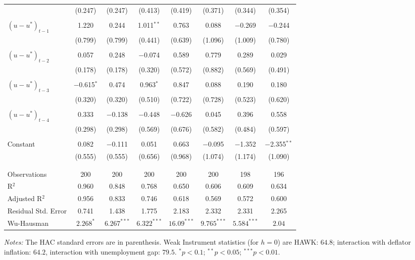 \documentclass[11pt]{article}
\begin{document}
\begin{table}[!htbp]
\begin{threeparttable}
\begin{tabular}{@{\extracolsep{5pt}}lccccccc}
    & (0.247) & (0.247) & (0.413) & (0.419) & (0.371) & (0.344) & (0.354) \\ 
    & & & & & & & \\ 
   $\left(u-u^*\right)_{t-1}$ & 1.220 & 0.244 & 1.011$^{**}$ & 0.763 & 0.088 & $-$0.269 & $-$0.244 \\ 
    & (0.799) & (0.799) & (0.441) & (0.639) & (1.096) & (1.009) & (0.780) \\ 
    & & & & & & & \\ 
    $\left(u-u^*\right)_{t-2}$ & 0.057 & 0.248 & $-$0.074 & 0.589 & 0.779 & 0.289 & 0.029 \\ 
    & (0.178) & (0.178) & (0.320) & (0.572) & (0.882) & (0.569) & (0.491) \\ 
    & & & & & & & \\ 
    $\left(u-u^*\right)_{t-3}$ & $-$0.615$^{*}$ & 0.474 & 0.963$^{*}$ & 0.847 & 0.088 & 0.190 & 0.180 \\ 
    & (0.320) & (0.320) & (0.510) & (0.722) & (0.728) & (0.523) & (0.620) \\ 
    & & & & & & & \\ 
    $\left(u-u^*\right)_{t-4}$ & 0.333 & $-$0.138 & $-$0.448 & $-$0.626 & 0.045 & 0.396 & 0.558 \\ 
    & (0.298) & (0.298) & (0.569) & (0.676) & (0.582) & (0.484) & (0.597) \\ 
    & & & & & & & \\ 

  
   Constant & 0.082 & $-$0.111 & 0.051 & 0.663 & $-$0.095 & $-$1.352 & $-$2.355$^{**}$ \\ 
    & (0.555) & (0.555) & (0.656) & (0.968) & (1.074) & (1.174) & (1.090) \\ 
    & & & & & & & \\ 
  \hline \\[-1.8ex] 
  Observations & 200 & 200 & 200 & 200 & 200 & 198 & 196 \\ 
  R$^{2}$ & 0.960 & 0.848 & 0.768 & 0.650 & 0.606 & 0.609 & 0.634 \\ 
  Adjusted R$^{2}$ & 0.956 & 0.833 & 0.746 & 0.618 & 0.569 & 0.572 & 0.600 \\ 
  Residual Std. Error & 0.741 & 1.438 & 1.775 & 2.183 & 2.332 & 2.331 & 2.265 \\ 
  Wu-Hausman & $2.268^{*}$& $6.267^{***}$ & $6.322^{***}$ & $16.09^{***}$ & $9.765^{***}$ & $5.584^{***}$ & $2.04$\\
  \hline 
  \hline
  \end{tabular} 
  \begin{tablenotes}[flushleft]
    \item[] \textit{Notes:} The \citet{Andrews1991} HAC standard errors are in parenthesis. Weak Instrument statistics (for $h=0$) are HAWK: $64.8$; interaction with deflator inflation: $64.2$, interaction with unemployment gap: $79.5$. $^{*}p<0.1$; $^{**}p<0.05$; $^{***}p<0.01$.
  \end{tablenotes}
\end{threeparttable}
    \end{table} 
\end{document}
